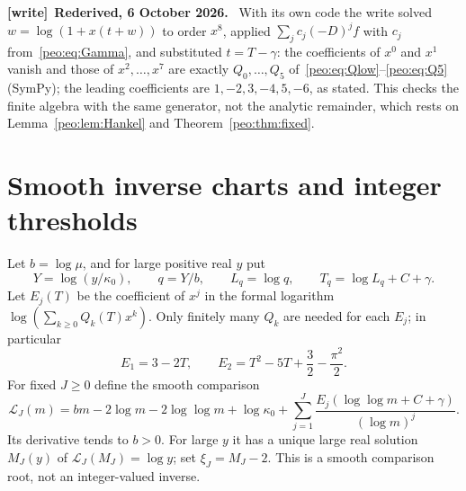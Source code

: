 \documentclass[11pt]{article}
\numberwithin{equation}{section}
\theoremstyle{remark}\newtheorem{remark}[theorem]{Remark}
\newcommand{\Li}{\mathcal L}
\newenvironment{writenote}[1][]{\par\smallskip\begingroup\small
 \noindent\textbf{[write]}\if\relax\detokenize{#1}\relax\else~\textbf{#1.}\fi\ }%
 {\par\endgroup\smallskip}
\begin{document}
\begin{writenote}[Rederived, 6 October 2026]
With its own code the write solved $w=\log(1+x(t+w))$ to order $x^8$, applied
$\sum_jc_j(-D)^jf$ with $c_j$ from~\eqref{peo:eq:Gamma}, and substituted
$t=T-\gamma$: the coefficients of $x^0$ and $x^1$ vanish and those of
$x^2,\dots,x^7$ are exactly $Q_0,\dots,Q_5$ of~\eqref{peo:eq:Qlow}--\eqref{peo:eq:Q5}
(SymPy); the leading coefficients are $1,-2,3,-4,5,-6$, as stated. This
checks the finite algebra with the same generator, not the analytic
remainder, which rests on Lemma~\ref{peo:lem:Hankel} and
Theorem~\ref{peo:thm:fixed}.
\end{writenote}

\section{Smooth inverse charts and integer thresholds}\label{peo:sec:inverse}
Let $b=\log\mu$, and for large positive real $y$ put
\begin{equation}
 Y=\log(y/\kappa_0),\qquad q=Y/b,\qquad
 L_q=\log q,\qquad T_q=\log L_q+C+\gamma.
\end{equation}
Let $E_j(T)$ be the coefficient of $x^j$ in the formal logarithm
$\log(\sum_{k\ge0}Q_k(T)x^k)$. Only finitely many $Q_k$ are needed for each $E_j$; in particular
\begin{equation}
 E_1=3-2T,\qquad E_2=T^2-5T+\frac32-\frac{\pi^2}{2}.
\end{equation}
For fixed $J\ge0$ define the smooth comparison
\begin{equation}
 \Li_J(m)=bm-2\log m-2\log\log m+\log\kappa_0
 +\sum_{j=1}^J\frac{E_j(\log\log m+C+\gamma)}{(\log m)^j}.
 \label{peo:eq:comparison}
\end{equation}
Its derivative tends to $b>0$. For large $y$ it has a unique large real solution $M_J(y)$ of $\Li_J(M_J)=\log y$; set $\xi_J=M_J-2$. This is a smooth comparison root, not an integer-valued inverse.
\end{document}
